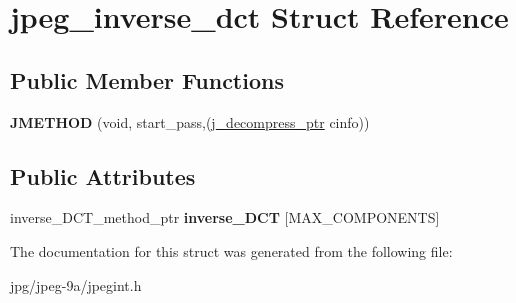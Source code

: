 \hypertarget{structjpeg__inverse__dct}{\section{jpeg\+\_\+inverse\+\_\+dct Struct Reference}
\label{structjpeg__inverse__dct}
}
\subsection*{Public Member Functions}
\begin{DoxyCompactItemize}
\item 
\hypertarget{structjpeg__inverse__dct_a2e9c37cdc48deba795ea5ede7834a3c0}{{\bfseries J\+M\+E\+T\+H\+O\+D} (void, start\+\_\+pass,(\hyperlink{structjpeg__decompress__struct}{j\+\_\+decompress\+\_\+ptr} cinfo))}\label{structjpeg__inverse__dct_a2e9c37cdc48deba795ea5ede7834a3c0}

\end{DoxyCompactItemize}
\subsection*{Public Attributes}
\begin{DoxyCompactItemize}
\item 
\hypertarget{structjpeg__inverse__dct_aa05e35a50f28daf199d2efa702a72c2a}{inverse\+\_\+\+D\+C\+T\+\_\+method\+\_\+ptr {\bfseries inverse\+\_\+\+D\+C\+T} \mbox{[}M\+A\+X\+\_\+\+C\+O\+M\+P\+O\+N\+E\+N\+T\+S\mbox{]}}\label{structjpeg__inverse__dct_aa05e35a50f28daf199d2efa702a72c2a}

\end{DoxyCompactItemize}


The documentation for this struct was generated from the following file\+:\begin{DoxyCompactItemize}
\item 
jpg/jpeg-\/9a/jpegint.\+h\end{DoxyCompactItemize}
